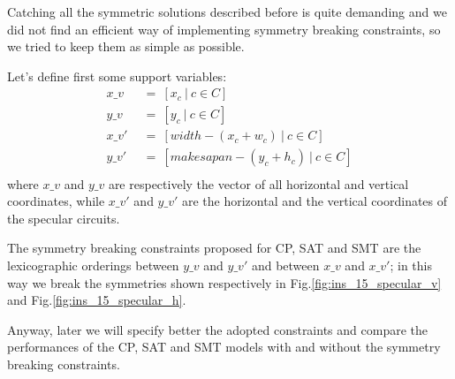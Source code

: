         Catching all the symmetric solutions described before is quite demanding and we did not find an 
        efficient way of implementing symmetry breaking constraints, so we tried to keep them as simple 
        as possible.

        Let's define first some support variables:
        \begin{align*}
            x\_v\   &\ =\ [x_c\ |\ c \in C]                     \\
            y\_v\   &\ =\ [y_c\ |\ c \in C]                     \\
            x\_v'\  &\ =\ [width - (x_c + w_c)\ |\ c \in C]     \\
            y\_v'\  &\ =\ [makesapan - (y_c + h_c)\ |\ c \in C] \\ 
            \label{eq:specular_coord}
        \end{align*}
        where $x\_v$ and $y\_v$ are respectively the vector of all horizontal and vertical coordinates,
        while $x\_v'$ and $y\_v'$ are the horizontal and the vertical coordinates of the specular circuits.

        The symmetry breaking constraints proposed for CP, SAT and SMT are the lexicographic orderings
        between $y\_v$ and $y\_v'$ and between $x\_v$ and $x\_v'$; in this way we break the 
        symmetries shown respectively in Fig.\ref{fig:ins_15_specular_v} and Fig.\ref{fig:ins_15_specular_h}.

        Anyway, later we will specify better the adopted constraints and compare the performances of the 
        CP, SAT and SMT models with and without the symmetry breaking constraints.
